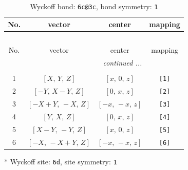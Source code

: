 \documentclass[fleqn,8pt]{jsarticle}
\begin{document}
\renewcommand{\arraystretch}{1.2}
\begin{longtable}{cccc}
\caption{Wyckoff bond: {\tt 6c@3c}, bond symmetry: {\tt 1}}
 \\
 \hline \hline
No. & vector & center & mapping \\ \hline \endfirsthead

\multicolumn{3}{l}{\tablename\ \thetable{}} \\
 \hline \hline
No. & vector & center & mapping \\ \hline \endhead

 \hline \hline
\multicolumn{3}{r}{\footnotesize\it continued ...} \\ \endfoot

 \hline \hline
\multicolumn{3}{r}{} \\ \endlastfoot

1 & $\left[ X,\, Y,\, Z \right]$ & $\left[ x,\, 0,\, z \right]$ & {\tt [1]} \\ \hline
2 & $\left[ - Y,\, X - Y,\, Z \right]$ & $\left[ 0,\, x,\, z \right]$ & {\tt [2]} \\ \hline
3 & $\left[ - X + Y,\, - X,\, Z \right]$ & $\left[ - x,\, - x,\, z \right]$ & {\tt [3]} \\ \hline
4 & $\left[ Y,\, X,\, Z \right]$ & $\left[ 0,\, x,\, z \right]$ & {\tt [4]} \\ \hline
5 & $\left[ X - Y,\, - Y,\, Z \right]$ & $\left[ x,\, 0,\, z \right]$ & {\tt [5]} \\ \hline
6 & $\left[ - X,\, - X + Y,\, Z \right]$ & $\left[ - x,\, - x,\, z \right]$ & {\tt [6]} \\
\end{longtable}
* Wyckoff site: {\tt 6d}, site symmetry: {\tt 1}
\renewcommand{\arraystretch}{1.2}
\end{document}
